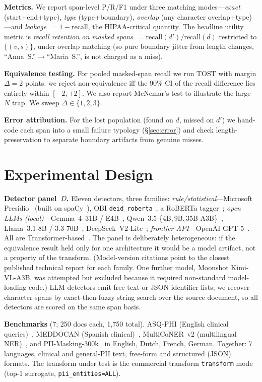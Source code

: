 \documentclass[pmlr,twocolumn,10pt]{jmlr}
\newcommand{\tp}[1]{\texttt{#1}}
\begin{document}
\textbf{Metrics.} We report span-level P/R/F1 under three matching modes---\emph{exact} (start+end+type), \emph{type} (type+boundary), \emph{overlap} (any character overlap+type)---and \emph{leakage}~$=1-\text{recall}$, the HIPAA-critical quantity. The headline utility metric is \emph{recall retention on masked spans}~$=\text{recall}(d')/\text{recall}(d)$ restricted to $\{(v,s)\}$, under overlap matching (so pure boundary jitter from length changes, ``Anna~S.''$\rightarrow$``Maria~S.'', is not charged as a miss).

\textbf{Equivalence testing.} For pooled masked-span recall we run TOST with margin $\Delta=2$ points: we reject non-equivalence iff the 90\% CI of the recall difference lies entirely within $[-2,+2]$. We also report McNemar's test to illustrate the large-$N$ trap. We sweep $\Delta\in\{1,2,3\}$.

\textbf{Error attribution.} For the lost population (found on $d$, missed on $d'$) we hand-code each span into a small failure typology (\S\ref{sec:error}) and check length-preservation to separate boundary artifacts from genuine misses.

\section{Experimental Design}\label{sec:design}
\textbf{Detector panel~$D$.} Eleven detectors, three families: \emph{rule/statistical}---Microsoft Presidio~\citep{presidio} (built on spaCy~\citep{spacy}), OBI \tp{deid\_roberta}~\citep{johnson2020deid}, a RoBERTa tagger~\citep{liu2019roberta,devlin2019bert}; \emph{open LLMs (local)}---Gemma~4~31B / E4B~\citep{gemma2report}, Qwen~3.5-\{4B,\,9B,\,35B-A3B\}~\citep{qwen25report}, Llama~3.1-8B / 3.3-70B~\citep{llama3herd}, DeepSeek~V2-Lite~\citep{deepseekv2}; \emph{frontier API}---OpenAI GPT-5~\citep{openai2023gpt4}. All are Transformer-based~\citep{vaswani2017attention}. The panel is deliberately heterogeneous: if the equivalence result held only for one architecture it would be a model artifact, not a property of the transform. (Model-version citations point to the closest published technical report for each family. One further model, Moonshot Kimi-VL-A3B, was attempted but excluded because it required non-standard model-loading code.) LLM detectors emit free-text or JSON identifier lists; we recover character spans by exact-then-fuzzy string search over the source document, so all detectors are scored on the same span basis.

\textbf{Benchmarks} (7; 250 docs each, 1{,}750 total). ASQ-PHI (English clinical queries)~\citep{weatherhead2026asqphi}, MEDDOCAN (Spanish clinical)~\citep{marimon2019meddocan}, MultiCoNER~v2 (multilingual NER)~\citep{malmasi2022multiconer,fetahu2023multiconer}, and PII-Masking-300k~\citep{ai4privacy2023} in English, Dutch, French, German. Together: 7 languages, clinical and general-PII text, free-form and structured (JSON) formats. The transform under test is the commercial transform \tp{transform} mode (top-1 surrogate, \tp{pii\_entities=ALL}).
\end{document}
